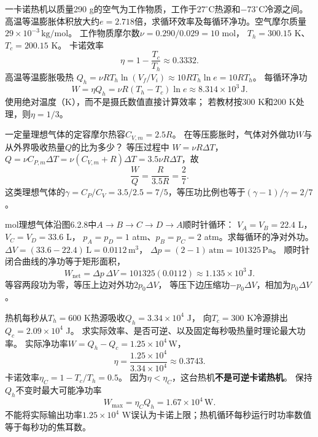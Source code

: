 \problemtext 一卡诺热机以质量290 g的空气为工作物质，工作于$27^\circ\mathrm C$热源和$-73^\circ\mathrm C$冷源之间。高温等温膨胀体积放大约$e=2.718$倍，求循环效率及每循环净功。空气摩尔质量$29\times10^{-3}\,\mathrm{kg/mol}$。
\workings
工作物质摩尔数$\nu=0.290/0.029=10$ mol，
$T_h=300.15$ K、$T_c=200.15$ K。
卡诺效率
\[
\boxed{\eta=1-\frac{T_c}{T_h}
\approx0.3332}.
\]
高温等温膨胀吸热
$Q_h=\nu RT_h\ln(V_f/V_i)\approx10RT_h\ln e=10RT_h$。
每循环净功
\[
\boxed{W=\eta Q_h=\nu R(T_h-T_c)\ln e
\approx8.314\times10^3\,\mathrm J}.
\]
\crosscheck 使用绝对温度（K），而不是摄氏数值直接计算效率；
若教材按300 K和200 K处理，则$\eta=1/3$。

\problemtext 一定量理想气体的定容摩尔热容$C_{V,m}=2.5R$。
在等压膨胀时，气体对外做功$W$与从外界吸收热量$Q$的比为多少？
\workings
等压过程中
$W=\nu R\Delta T$，
$Q=\nu C_{P,m}\Delta T=\nu(C_{V,m}+R)\Delta T
=3.5\nu R\Delta T$，故
\[
\boxed{\frac WQ=\frac{R}{3.5R}=\frac27}.
\]
\crosscheck 这类理想气体的$\gamma=C_P/C_V=3.5/2.5=7/5$，等压功比例也等于$(\gamma-1)/\gamma=2/7$。

 mol理想气体沿图6.2.8中$A\to B\to C\to D\to A$顺时针循环：
$V_A=V_B=22.4$ L，$V_C=V_D=33.6$ L，
$p_A=p_D=1$ atm、$p_B=p_C=2$ atm。求每循环的净对外功。
\workings
$\Delta V=(33.6-22.4)\,\mathrm L=0.0112\,\mathrm{m^3}$，
$\Delta p=(2-1)\,\mathrm{atm}=101325\,\mathrm{Pa}$。
顺时针闭合曲线的净功等于矩形面积，
\[
\boxed{W_{\mathrm{net}}
=\Delta p\,\Delta V
=101325(0.0112)\approx1.135\times10^3\,\mathrm J}.
\]
\crosscheck 等容两段功为零，等压上边对外功$2p_0\Delta V$，
等压下边压缩功$-p_0\Delta V$，相加为$p_0\Delta V$。

\problemtext 热机每秒从$T_h=600$ K热源吸收$Q_h=3.34\times10^4$ J，
向$T_c=300$ K冷源排出$Q_c=2.09\times10^4$ J。
求实际效率、是否可逆、以及固定每秒吸热量时理论最大功率。
\workings
实际净功率$W=Q_h-Q_c=1.25\times10^4\,\mathrm{W}$，
\[
\boxed{\eta=\frac{1.25\times10^4}{3.34\times10^4}
\approx0.3743}.
\]
卡诺效率$\eta_C=1-T_c/T_h=0.5$。
因为$\eta<\eta_C$，这台热机\textbf{不是可逆卡诺热机}。
保持$Q_h$不变时最大可能净功率
\[
\boxed{W_{\max}=\eta_C Q_h
=1.67\times10^4\,\mathrm W}.
\]
\crosscheck 不能将实际输出功率$1.25\times10^4$ W误认为卡诺上限；热机循环每秒运行时功率数值等于每秒功的焦耳数。
